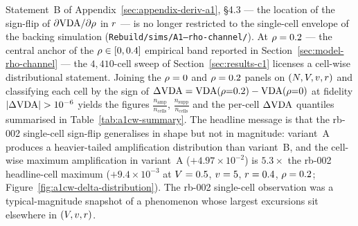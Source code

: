 Statement~B of Appendix~\ref{sec:appendix-deriv-a1}, §4.3 — the
location of the sign-flip of $\partial \mathrm{VDA} / \partial \rho$ in
$r$ — is no longer restricted to the single-cell envelope of
the backing simulation
(\texttt{Rebuild/sims/A1--rho-channel/}). At $\rho = 0.2$ — the
central anchor of the $\rho \in [0, 0.4]$ empirical band reported
in Section~\ref{sec:model-rho-channel} — the
$4{,}410$-cell sweep of Section~\ref{sec:results-c1} licenses a
cell-wise distributional statement. Joining the $\rho = 0$ and
$\rho = 0.2$ panels on $(N, V, v, r)$ and
classifying each cell by the sign of
$\Delta\mathrm{VDA} = \mathrm{VDA}(\rho{=}0.2) - \mathrm{VDA}(\rho{=}0)$ at fidelity
$|\Delta\mathrm{VDA}| > 10^{-6}$ yields the figures
$\frac{n_{\mathrm{amp}}}{n_{\mathrm{cells}}}$,
$\frac{n_{\mathrm{supp}}}{n_{\mathrm{cells}}}$ and the per-cell
$\Delta\mathrm{VDA}$ quantiles summarised in Table~\ref{tab:a1cw-summary}.
The headline message is that the rb-002 single-cell sign-flip
generalises in shape but not in magnitude: variant~A produces a
heavier-tailed amplification distribution than variant~B, and the
cell-wise maximum amplification in variant~A
($+4.97 \times 10^{-2}$) is $5.3\times$ the rb-002 headline-cell
maximum ($+9.4 \times 10^{-3}$ at $V = 0.5$, $v = 5$,
$r = 0.4$, $\rho = 0.2$;
Figure~\ref{fig:a1cw-delta-distribution}). The rb-002 single-cell
observation was a typical-magnitude snapshot of a phenomenon whose
largest excursions sit elsewhere in $(V, v, r)$.


